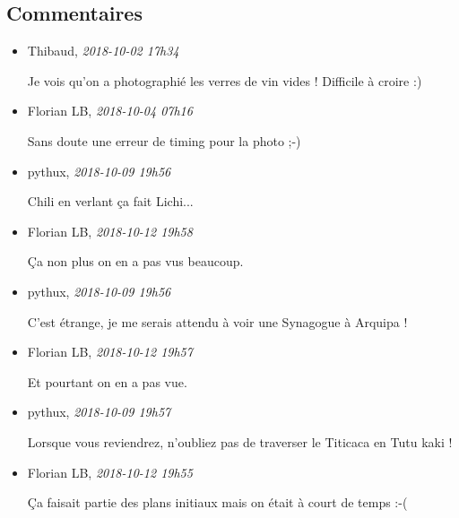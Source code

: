 \hypertarget{commentaires}{%
\subsection{Commentaires}\label{commentaires}}

\begin{itemize}
\item
  Thibaud, \emph{2018-10-02 17h34}

  Je vois qu'on a photographié les verres de vin vides ! Difficile à
  croire :)
\item
  Florian LB, \emph{2018-10-04 07h16}

  Sans doute une erreur de timing pour la photo ;-)
\item
  pythux, \emph{2018-10-09 19h56}

  Chili en verlant ça fait Lichi...
\item
  Florian LB, \emph{2018-10-12 19h58}

  Ça non plus on en a pas vus beaucoup.
\item
  pythux, \emph{2018-10-09 19h56}

  C'est étrange, je me serais attendu à voir une Synagogue à Arquipa !
\item
  Florian LB, \emph{2018-10-12 19h57}

  Et pourtant on en a pas vue.
\item
  pythux, \emph{2018-10-09 19h57}

  Lorsque vous reviendrez, n'oubliez pas de traverser le Titicaca en
  Tutu kaki !
\item
  Florian LB, \emph{2018-10-12 19h55}

  Ça faisait partie des plans initiaux mais on était à court de temps
  :-(
\end{itemize}
